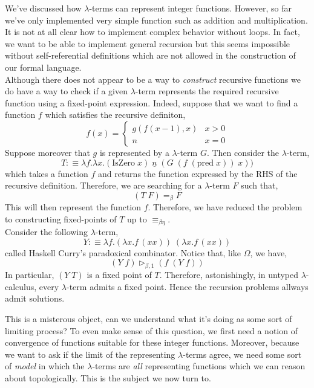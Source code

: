 \documentclass[12pt]{article}
\newcommand{\red}{\triangleright}
\newcommand{\bredo}{\red_{\beta,1}}
\begin{document}
We've discussed how $\lambda$-terms can represent integer functions. However, so far we've only implemented very simple function such as addition and multiplication. It is not at all clear how to implement complex behavior without loops. In fact, we want to be able to implement general recursion but this seems impossible without self-referential definitions which are not allowed in the construction of our formal language. 
\bigskip\\
Although there does not appear to be a way to \textit{construct} recursive functions we do have a way to check if a given $\lambda$-term represents the required recursive function using a fixed-point expression. Indeed, suppose that we want to find a function $f$ which satisfies the recursive definiton,
\[ f(x) = 
\begin{cases}
g(f(x-1), x) & x > 0
\\
n & x = 0
\end{cases}\]
Suppose moreover that $g$ is represented by a $\lambda$-term $G$. Then consider the $\lambda$-term,
\[ T :\equiv \lambda f . \lambda x . (\text{IsZero} \; x) \; \underline{n} \; (G \; (f \; (\text{pred} \; x)) \; x)) \]
which takes a function $f$ and returns the function expressed by the RHS of the recursive definition. Therefore, we are searching for a $\lambda$-term $F$ such that,
\[ (T \; F) =_\beta F \]
This will then represent the function $f$. Therefore, we have reduced the problem to constructing fixed-points of $T$ up to $\equiv_{\beta\eta}$.  
\bigskip\\
Consider the following $\lambda$-term,
\[ Y :\equiv \lambda f. (\lambda x. f \, (x x)) \; (\lambda x. f \, (x x)) \]
called Haskell Curry's paradoxical combinator.
Notice that, like $\Omega$, we have,
\[ (Y \; f) \bredo (f \; (Y \; f)) \]
In particular, $(Y \; T)$ is a fixed point of $T$. Therefore, astonishingly, in untyped $\lambda$-calculus, every $\lambda$-term admits a fixed point. Hence the recursion problems allways admit solutions. 
\par 
This is a misterous object, can we understand what it's doing as some sort of limiting process?
To even make sense of this question, we first need a notion of convergence of functions suitable for these integer functions. Moreover, because we want to ask if the limit of the representing $\lambda$-terms agree, we need some sort of \textit{model} in which the $\lambda$-terms are \textit{all} representing functions which we can reason about topologically. This is the subject we now turn to. 
\end{document}
